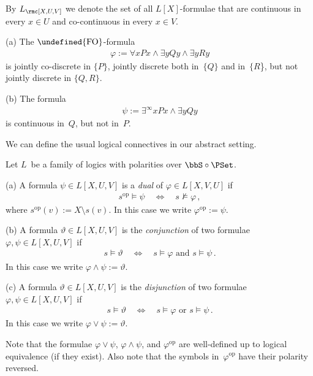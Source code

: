 \documentclass[10pt, fleqn]{scrartcl}
\makeatletter
\newcommand\m@thsm@ller[2]{\mbox{\relscale{0.91}$\m@th#1#2$}}
\let\smaller\undefined
\DeclareRobustCommand\smaller[1]{\relax\ifmmode{\mathpalette\m@thsm@ller{#1}}\else{\relscale{0.91}#1}\fi}
\newcommand*{\op}{\mathrm{op}}
\newcommand*{\FO}{\smaller{\mathrm{FO}}}
\newcommand*{\?}{\kern .08em}
\newcommand\nmodels{\not\models}
\newcommand\upqed{\vskip-\baselineskip\vskip-\belowdisplayskip}
\makeatother
\begin{document}
\begin{Def}
By $L_\rmc[X,U,V]$ we denote the set of all $L[X]$-formulae that are
continuous in every $x \in U$ and co-continuous in every $x \in V$.
\end{Def}
\begin{Exam}
(a) The $\FO$-formula
\begin{align*}
  \varphi := \forall xPx \land \exists yQy \land \exists yRy
\end{align*}
is jointly co-discrete in $\{P\}$, jointly discrete both in~$\{Q\}$ and in~$\{R$\},
but not jointly discrete in $\{Q,R\}$.

(b) The formula
\begin{align*}
  \psi := \exists^\infty xPx \land \exists yQy
\end{align*}
is continuous in~$Q$, but not in~$P$.
\end{Exam}

We can define the usual logical connectives in our abstract setting.
\begin{Def}
Let $L$~be a family of logics with polarities over $\bbS \circ \PSet$.

(a) A formula $\psi \in L[X,U,V]$ is a \emph{dual} of $\varphi \in L[X,V,U]$ if
\begin{align*}
  s^\op \models \psi \quad\iff\quad s \nmodels \varphi\,,
\end{align*}
where $s^\op(v) := X \setminus s(v)$.
In this case we write $\varphi^\op := \psi$.

(b) A formula $\vartheta \in L[X,U,V]$ is the \emph{conjunction} of two formulae
$\varphi,\psi \in L[X,U,V]$ if
\begin{align*}
  s \models \vartheta \quad\iff\quad s \models \varphi \text{ and } s \models \psi\,.
\end{align*}
In this case we write $\varphi \land \psi := \vartheta$.

(c) A formula $\vartheta \in L[X,U,V]$ is the \emph{disjunction} of two formulae
$\varphi,\psi \in L[X,U,V]$ if
\begin{align*}
  s \models \vartheta \quad\iff\quad s \models \varphi \text{ or } s \models \psi\,.
\end{align*}
In this case we write $\varphi \lor \psi := \vartheta$.
\end{Def}
\begin{Rem}
Note that the formulae $\varphi \lor \psi$, $\varphi \land \psi$, and $\varphi^\op$
are well-defined up to logical equivalence (if they exist).
Also note that the symbols in~$\varphi^\op$ have their polarity reversed.
\end{Rem}
\begin{Exams}
For the first-order logic, we have
\begin{align*}
  [Px \lor \exists y(Exy \land Qy)]^\op &= Px \land \forall y(Exy \lso Qy)\,, \\
  \bigl[\exists x[Px \land \forall y[y \neq x \lso Qy]\bigr]^\op
  &= \forall x[Px \lor \exists y[y \neq x \land Qy]]\,.
\end{align*}
\upqed
\end{Exams}
\end{document}
